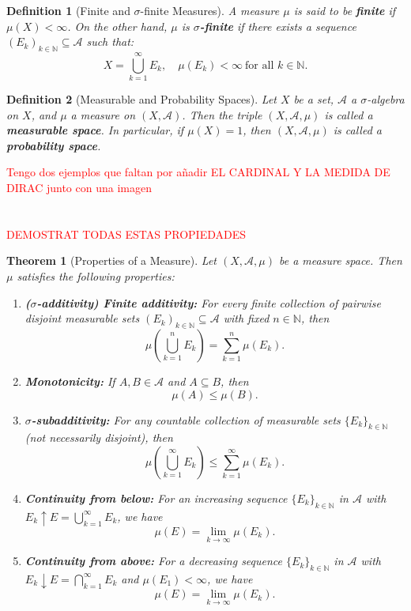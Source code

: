 \documentclass[10pt, oneside]{article}
\newenvironment{definitionbox}[1][]{\begin{defbox}\begin{defn}[#1]}{\end{defn}\end{defbox}}
\numberwithin{equation}{section}
\newtheorem{thm}{Theorem}[section]
\newtheorem{defn}{Definition}[section]
\begin{document}
\begin{definitionbox}[Finite and $\sigma$-finite Measures]\label{def:finite}
A measure $\mu$ is said to be \textbf{finite} if $\mu(X) < \infty$.
On the other hand, $\mu$ is \textbf{$\sigma$-finite} if there exists a sequence $(E_k)_{k \in \mathbb{N}} \subseteq \mathcal{A}$ such that:
\[
X = \bigcup_{k=1}^{\infty} E_k, \quad \mu(E_k) < \infty \ \text{for all } k \in \mathbb{N}.
\]
\end{definitionbox}

\begin{definitionbox}[Measurable and Probability Spaces]\label{def:measurable}
Let $X$ be a set, $\mathcal{A}$ a $\sigma$-algebra on $X$, and $\mu$ a measure on $(X, \mathcal{A})$.
Then the triple $(X, \mathcal{A}, \mu)$ is called a \textbf{measurable space}.
In particular, if $\mu(X) = 1$, then $(X, \mathcal{A}, \mu)$ is called a \textbf{probability space}.
\end{definitionbox}

\textcolor{red}{Tengo dos ejemplos que faltan por añadir EL CARDINAL Y LA MEDIDA DE DIRAC junto con una imagen}
\\
\\
\\

\textcolor{red}{DEMOSTRAT TODAS ESTAS PROPIEDADES}
\begin{thm}[Properties of a Measure]\label{thm:measure-props}
Let $(X, \mathcal{A}, \mu)$ be a measure space. Then $\mu$ satisfies the following properties:
\begin{enumerate}[label=(\alph*)]
    \item \textbf{(\(\sigma\)-additivity) Finite additivity:}
    For every finite collection of pairwise disjoint measurable sets $(E_k)_{k \in \mathbb{N}} \subseteq \mathcal{A}$ with fixed $n \in \mathbb{N}$, then
    \[
    \mu\!\left( \bigcup_{k=1}^{n} E_k \right) = \sum_{k=1}^{n} \mu(E_k).
    \]
    \item \textbf{Monotonicity:}  
    If $A,B \in \mathcal{A}$ and $A \subseteq B$, then 
    \[
    \mu(A) \le \mu(B).
    \]

    \item \textbf{\(\sigma\)-subadditivity:}  
    For any countable collection of measurable sets $\{E_k\}_{k \in \mathbb{N}}$ (not necessarily disjoint), then
    \[
    \mu\!\left( \bigcup_{k=1}^{\infty} E_k \right) \le \sum_{k=1}^{\infty} \mu(E_k).
    \]

    \item \textbf{Continuity from below:}  
    For an increasing sequence $\{E_k\}_{k \in \mathbb{N}}$ in $\mathcal{A}$ with $E_k \uparrow E = \bigcup_{k=1}^{\infty} E_k$, we have
    \[
    \mu(E) = \lim_{k \to \infty} \mu(E_k).
    \]

    \item \textbf{Continuity from above:}  
    For a decreasing sequence $\{E_k\}_{k \in \mathbb{N}}$ in $\mathcal{A}$ with $E_k \downarrow E = \bigcap_{k=1}^{\infty} E_k$ and $\mu(E_1) < \infty$, we have
    \[
    \mu(E) = \lim_{k \to \infty} \mu(E_k).
    \]
\end{enumerate}
\end{thm}
\end{document}
